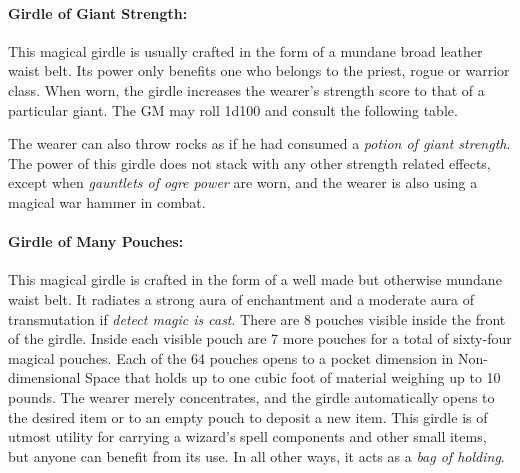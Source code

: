 \begin{multicols}{2} 

\paragraph{Girdle of Giant Strength:} This magical girdle is usually crafted in the form of a mundane broad leather waist belt.  Its power only benefits one who belongs to the priest, rogue or warrior class.  When worn, the girdle increases the wearer's strength score to that of a particular giant.  The GM may roll 1d100 and consult the following table.

The wearer can also throw rocks as if he had consumed a \textit{potion of giant strength}.   The power of this girdle does not stack with any other strength related effects, except when \textit{gauntlets of ogre power} are worn, and the wearer is also using a magical war hammer in combat.

\paragraph{Girdle of Many Pouches:} This magical girdle is crafted in the form of a well made but otherwise mundane waist belt.  It radiates a strong aura of enchantment and a moderate aura of transmutation if \textit{detect magic is cast}.  There are 8 pouches visible inside the front of the girdle.  Inside each visible pouch are 7 more pouches for a total of sixty-four magical pouches.  Each of the 64 pouches opens to a pocket dimension in Non-dimensional Space that holds up to one cubic foot of material weighing up to 10 pounds.  The wearer merely concentrates, and the girdle automatically opens to the desired item or to an empty pouch to deposit a new item.  This girdle is of utmost utility for carrying a wizard's spell components and other small items, but anyone can benefit from its use.  In all other ways, it acts as a \textit{bag of holding}.


\end{multicols}
